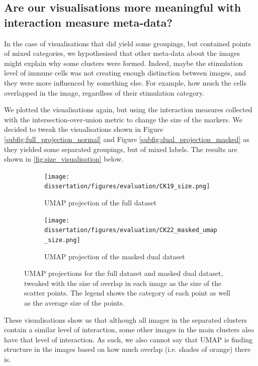 \subsection{Are our visualisations more meaningful with interaction measure meta-data?}

In the case of visualisations that did yield some groupings, but contained points of mixed categories, we hypothesised that other meta-data about the images might explain why some clusters were formed. Indeed, maybe the stimulation level of immune cells was not creating enough distinction between images, and they were more influenced by something else. For example, how much the cells overlapped in the image, regardless of their stimulation category.

We plotted the visualisations again, but using the interaction measures collected with the intersection-over-union metric to change the size of the markers. We decided to tweak the visualisations shown in Figure \ref{subfig:full_projection_normal} and Figure \ref{subfig:dual_projection_masked} as they yielded some separated groupings, but of mixed labels. The results are shown in \autoref{fig:size_visualisation} below.

\begin{figure}[h!]
    \centering
    \begin{subfigure}{.45\textwidth}
        \texttt{[image: dissertation/figures/evaluation/CK19\_size.png]}
        \caption{UMAP projection of the full dataset}
    \end{subfigure}
    \begin{subfigure}{.45\textwidth}
        \texttt{[image: dissertation/figures/evaluation/CK22\_masked\_umap\_size.png]}
        \caption{UMAP projection of the masked dual dataset}
    \end{subfigure}
    \caption{UMAP projections for the full dataset and masked dual dataset, tweaked with the size of overlap in each image as the size of the scatter points. The legend shows the category of each point as well as the average size of the points.}
    \label{fig:size_visualisation}
\end{figure}

These visualisations show us that although all images in the separated clusters contain a similar level of interaction, some other images in the main clusters also have that level of interaction. As such, we also cannot say that UMAP is finding structure in the images based on how much overlap (i.e. shades of orange) there is.

